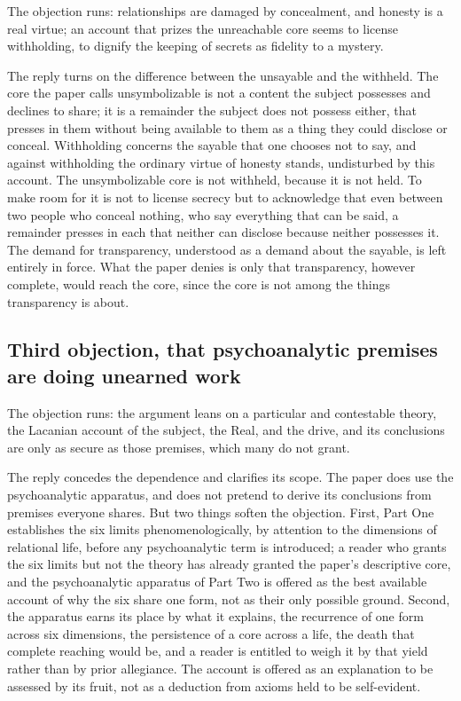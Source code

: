 The objection runs: relationships are damaged by concealment, and honesty is a real virtue; an account that prizes the unreachable core seems to license withholding, to dignify the keeping of secrets as fidelity to a mystery.

The reply turns on the difference between the unsayable and the withheld. The core the paper calls unsymbolizable is not a content the subject possesses and declines to share; it is a remainder the subject does not possess either, that presses in them without being available to them as a thing they could disclose or conceal. Withholding concerns the sayable that one chooses not to say, and against withholding the ordinary virtue of honesty stands, undisturbed by this account. The unsymbolizable core is not withheld, because it is not held. To make room for it is not to license secrecy but to acknowledge that even between two people who conceal nothing, who say everything that can be said, a remainder presses in each that neither can disclose because neither possesses it. The demand for transparency, understood as a demand about the sayable, is left entirely in force. What the paper denies is only that transparency, however complete, would reach the core, since the core is not among the things transparency is about.

\subsection*{Third objection, that psychoanalytic premises are doing unearned work}

The objection runs: the argument leans on a particular and contestable theory, the Lacanian account of the subject, the Real, and the drive, and its conclusions are only as secure as those premises, which many do not grant.

The reply concedes the dependence and clarifies its scope. The paper does use the psychoanalytic apparatus, and does not pretend to derive its conclusions from premises everyone shares. But two things soften the objection. First, Part One establishes the six limits phenomenologically, by attention to the dimensions of relational life, before any psychoanalytic term is introduced; a reader who grants the six limits but not the theory has already granted the paper's descriptive core, and the psychoanalytic apparatus of Part Two is offered as the best available account of why the six share one form, not as their only possible ground. Second, the apparatus earns its place by what it explains, the recurrence of one form across six dimensions, the persistence of a core across a life, the death that complete reaching would be, and a reader is entitled to weigh it by that yield rather than by prior allegiance. The account is offered as an explanation to be assessed by its fruit, not as a deduction from axioms held to be self-evident.

